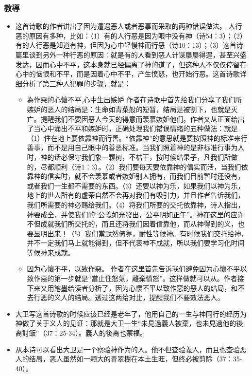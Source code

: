 \subsubsection{教導}
\begin{itemize}
\itemsep-.45em 
\item 这首诗歌的作者讲出了因为遭遇恶人或者恶事而采取的两种错误做法。
人行恶的原因有多种，比如：（1）有的人行恶是因为眼中没有神（诗54：3）；（2）有的人行恶是知道有神，但因为心中轻慢神而行恶（诗10：13）；（3）这首诗篇里谈到另外一种行恶的原因：就是有的人看到恶人计谋屡屡得逞，甚至兴盛发达，因而心中不平，这本身就已经偏离了神的道了，但这种人不仅仅停留在心中的恼恨和不平，而是因着心中不平，产生愤怒，也开始行恶。这首诗歌详细分析了第三种人犯罪的步骤，就是：

\begin{itemize}
\itemsep-.45em 
\item 為作惡的心懷不平,心中生出嫉妒
作者在诗歌中首先给我们分享了我们所嫉妒的恶人的结局是：生命如青菜般的短暂，结局是被割下，也就是灭亡。提醒我们不要因恶人今天的得意而羡慕嫉妒他们。作者又从正面给出了当心中涌出不平和嫉妒时，正确处理我们错误情绪的五种做法：就是（1）住在地上要依靠神而行善。“依靠神”的意思就是要按照神的标准来行善事，而不是用自己眼中的善恶标准。当我们照着神的是非标准行事为人时，神的话必保守我们象一颗树，不枯干，按时候结果子，凡我们所做的，尽都顺利（诗1：3）。（2）我们要每天要依靠神的信实而活，当我们依靠神的信实时，就不会羡慕或者嫉妒别人拥有，而我们目前暂时还没有，或者我们一生都不需要的东西。（3）还要以神为乐，如果我们以神为乐，地上的世人所有的虚荣自然不会再对我们有吸引力，并且作者告诉我们，我们所需要的神必赐给我们。（4）将我们所要的交托依靠神，诗人指出，神要成全，并使我们的“公義如光發出，公平明如正午”。神在这里的应许不但成就我们所交托的，而且还将我们因着信靠他，而从神得到的义，也要显明出来！（5）我们當默然倚靠，耐性等候神。有时候我们交托给神，并不一定我们马上就能得到，但不代表神不成就，所以我们要学习化时间等候神来成就。
\item 因为心懷不平，以致作惡。
作者在这里首先告诉我们避免因为心懷不平以致作惡的第一步就是“當止住怒氣，離棄憤怒”。这样做就可以从。作者接下来又用笔墨给读者分析了，因为心懷不平以致作惡的恶人的结局，和不去行恶的义人的结局。透过这两给对比，提醒我们不要效法恶人。
\end{itemize}

\item 大卫写这首诗歌的时候应该已经是老年了，他用自己的一生与神同行的经历为神做了关于义人的见证：那就是大卫一生“未見過義人被棄，也未見過他的後裔討飯”（37：25-34）。義人的後裔也蒙福。
\item 从本诗可以看出大卫是一个察验神作为的人。他不但查验義人，而且也查验恶人的结局，恶人虽然如一颗大的青翠樹在本土生旺，但终必被剪除（37：35-40）。
\end{itemize}

